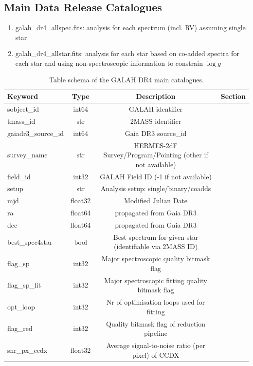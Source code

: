 \documentclass[
  journal=pasa,
  manuscript=research-paper, %
  year=2024,
  volume=37
]{cup-journal}
\newcommand{\logg}{$\log g$\xspace}
\begin{document}
\subsection{Main Data Release Catalogues}
\label{sec:data_release_catalogues}

\begin{enumerate}
   \item galah\_dr4\_allspec.fits: analysis for each spectrum (incl. RV) assuming single star
   \item galah\_dr4\_allstar.fits: analysis for each star based on co-added spectra for each star and using non-spectroscopic information to constrain \logg
\end{enumerate}

\begin{table}
\caption{Table schema of the GALAH DR4 main catalogues.} \label{tab:main_catalog_schema1}
\centering
\begin{tabular}{lccc}
\hline\hline
Keyword	&	Type	&	Description	&	Section	\\
\hline
sobject\_id	&	int64	&	GALAH identifier	&		\\
tmass\_id	&	str	&	2MASS identifier	&		\\
gaiadr3\_source\_id	&	int64	&	Gaia DR3 source\_id	&		\\
survey\_name	&	str	&	HERMES-2dF Survey/Program/Pointing (other if not available)	&		\\
field\_id	&	int32	&	GALAH Field ID (-1 if not available)	&		\\
setup	&	str	&	Analysis setup: single/binary/coadds	&		\\
mjd	&	float32	&	Modified Julian Date	&		\\
ra	&	float64	&	propagated from Gaia DR3	&		\\
dec	&	float64	&	propagated from Gaia DR3	&		\\
best\_spec4star	&	bool	&	Best spectrum for given star (identifiable via 2MASS ID)	&		\\
flag\_sp	&	int32	&	Major spectroscopic quality bitmask flag	&		\\
flag\_sp\_fit	&	int32	&	Major spectroscopic fitting quality bitmask flag	&		\\
opt\_loop	&	int32	&	Nr of optimisation loops used for fitting	&		\\
flag\_red	&	int32	&	Quality bitmask flag of reduction pipeline	&		\\
snr\_px\_ccdx	&	float32	&	Average signal-to-noise ratio (per pixel) of CCDX	&		\\

\end{tabular}
\end{table}
\end{document}

